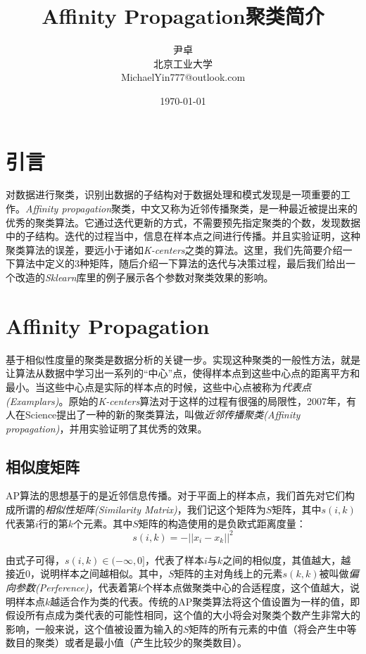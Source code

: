 \documentclass[UTF8, 12pt]{ctexart}
\begin{document}
\title{\heiti Affinity Propagation聚类简介}
\author{\kaishu 尹卓\\北京工业大学\\MichaelYin777@outlook.com}
\date{\today}
\maketitle

\tableofcontents

\newpage
\section{引言}
对数据进行聚类，识别出数据的子结构对于数据处理和模式发现是一项重要的工作。\emph{Affinity propagation}聚类，中文又称为近邻传播聚类，是一种最近被提出来的优秀的聚类算法。它通过迭代更新的方式，不需要预先指定聚类的个数，发现数据中的子结构。迭代的过程当中，信息在样本点之间进行传播。并且实验证明，这种聚类算法的误差，要远小于诸如\emph{K-centers}之类的算法。这里，我们先简要介绍一下算法中定义的3种矩阵，随后介绍一下算法的迭代与决策过程，最后我们给出一个改造的\emph{Sklearn}库里的例子展示各个参数对聚类效果的影响。

\section{Affinity Propagation}
基于相似性度量的聚类是数据分析的关键一步。实现这种聚类的一般性方法，就是让算法从数据中学习出一系列的“中心”点，使得样本点到这些中心点的距离平方和最小。当这些中心点是实际的样本点的时候，这些中心点被称为\emph{代表点(Examplars)}。原始的\emph{K-centers}算法对于这样的过程有很强的局限性，2007年，有人在Science提出了一种的新的聚类算法，叫做\emph{近邻传播聚类(Affinity propagation)}，并用实验证明了其优秀的效果\cite{frey2007clustering}。

\subsection{相似度矩阵}
AP算法的思想基于的是近邻信息传播\cite{唐丹2017改进的近邻传播聚类算法及其应用研究}。对于平面上的样本点，我们首先对它们构成所谓的\emph{相似性矩阵(Similarity Matrix)}，我们记这个矩阵为$S$矩阵，其中$s(i,k)$代表第$i$行的第$k$个元素。其中$S$矩阵的构造使用的是负欧式距离度量：
\begin{equation}
	s(i,k) = -||x_{i}-x_{k}||^{2}
\end{equation}

由式子可得，$s(i,k)\in(-\infty,0]$，代表了样本$i$与$k$之间的相似度，其值越大，越接近0，说明样本之间越相似。其中，$S$矩阵的主对角线上的元素$s(k,k)$被叫做\emph{偏向参数(Perference)}，代表着第$k$个样本点做聚类中心的合适程度，这个值越大，说明样本点$k$越适合作为类的代表。传统的AP聚类算法将这个值设置为一样的值，即假设所有点成为类代表的可能性相同，这个值的大小将会对聚类个数产生非常大的影响，一般来说，这个值被设置为输入的$S$矩阵的所有元素的中值（将会产生中等数目的聚类）或者是最小值（产生比较少的聚类数目）\cite{frey2007clustering}。
\end{document}
